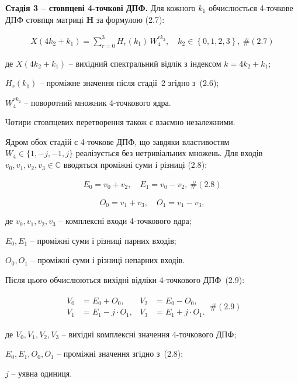 \documentclass[
]{article}
\begin{document}
\textbf{Стадія 3 -- стовпцеві 4-точкові ДПФ.} Для кожного \(k_{1}\)
обчислюється 4-точкове ДПФ стовпця матриці \(\mathbf{H}\) за формулою
(2.7):

\[\begin{array}{r}
X\left( 4k_{2} + k_{1} \right) = \sum_{r = 0}^{3}H_{r}\left( k_{1} \right)\, W_{4}^{rk_{2}},\quad k_{2} \in \left\{ 0,1,2,3 \right\},\ \#(2.7)
\end{array}\]

де \(X(4k_{2} + k_{1})\) -- вихідний спектральний відлік з індексом
\(k = 4k_{2} + k_{1}\);

\(H_{r}(k_{1})\) -- проміжне значення після стадії~2 згідно з~(2.6);

\(W_{4}^{rk_{2}}\) -- поворотний множник 4-точкового ядра.

Чотири стовпцевих перетворення також є взаємно незалежними.

Ядром обох стадій є 4-точкове ДПФ, що завдяки властивостям
\(W_{4} \in \{ 1, - j, - 1,j\}\) реалізується без нетривіальних множень.
Для входів \(v_{0},v_{1},v_{2},v_{3}\mathbb{\in C}\) вводяться проміжні
суми і різниці (2.8):

\[\begin{array}{r}
E_{0} = v_{0} + v_{2},\quad E_{1} = v_{0} - v_{2},\ \#(2.8)
\end{array}\]

\[O_{0} = v_{1} + v_{3},\quad O_{1} = v_{1} - v_{3},\]

де \(v_{0},v_{1},v_{2},v_{3}\) -- комплексні входи 4-точкового ядра;

\(E_{0},E_{1}\) -- проміжні суми і різниці парних входів;

\(O_{0},O_{1}\) -- проміжні суми і різниці непарних входів.

Після цього обчислюються вихідні відліки 4-точкового ДПФ~(2.9):

\[\begin{array}{r}
\begin{aligned}
V_{0} & = E_{0} + O_{0}, & V_{2} & = E_{0} - O_{0}, \\
V_{1} & = E_{1} - j \cdot O_{1}, & V_{3} & = E_{1} + j \cdot O_{1}.
\end{aligned}\ \#(2.9)
\end{array}\]

де \(V_{0},V_{1},V_{2},V_{3}\) -- вихідні комплексні значення
4-точкового ДПФ;

\(E_{0},E_{1},O_{0},O_{1}\) -- проміжні значення згідно з~(2.8);

\(j\) -- уявна одиниця.
\end{document}
